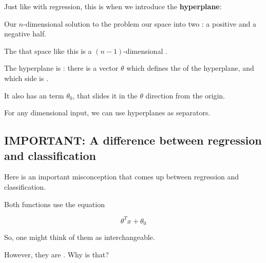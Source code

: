         Just like with regression, this is when we introduce the \textbf{hyperplane}:\\
        
        \begin{concept}
            Our $n$-dimensional  solution to the  problem  our space into two : a positive and a negative half.
            
            The  that  space like this is a $(n-1)$-dimensional .
            
            The hyperplane is : there is a  vector $\theta$ which defines the  of the hyperplane, and which side is .
            
            It also has an  term $\theta_0$, that slides it in the $\theta$ direction  from the origin.
        \end{concept}
        
        For any dimensional input, we can use hyperplanes as separators.
        
    
    \subsection{IMPORTANT: A difference between regression and classification}
    
        Here is an important misconception that comes up between regression and classification.
        
        Both functions use the equation
        
        \begin{equation}
            \theta^T x + \theta_0
        \end{equation}
        
        So, one might think of them as interchangeable.
        
        However, they are . Why is that?
        
